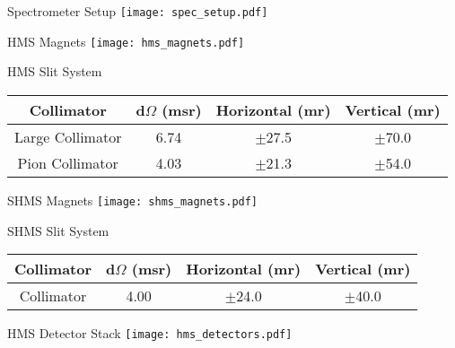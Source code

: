 \begin{Mfigure}{Spectrometer Setup}
  \centering
  \texttt{[image: spec\_setup.pdf]}
  \caption{Overview of Hall C Spectrometer setup.}
  \label{fig:2-4_spec_setup}
\end{Mfigure}

\begin{Mfigure}{HMS Magnets}
  \centering
  \texttt{[image: hms\_magnets.pdf]}
  \caption{Overview of HMS optical setup.}
  \label{fig:2-4_hms_magnets}
\end{Mfigure}

\begin{Mtable}{HMS Slit System}
  \centering
  \begin{tabular}{|c|c|c|c|}
    \hline
    \textbf{Collimator} & \textbf{d$\Omega$ (msr)} & \textbf{Horizontal (mr)} & \textbf{Vertical (mr)} \\
    \hline
    Large Collimator & 6.74 & $\pm$27.5 & $\pm$70.0 \\
    Pion Collimator & 4.03 & $\pm$21.3 & $\pm$54.0 \\
    \hline
  \end{tabular}
  \caption{Breakdown of HMS slit system's apertures.}
  \label{tab:2-4_hms_slit}
\end{Mtable}

\begin{Mfigure}{SHMS Magnets}
  \centering
  \texttt{[image: shms\_magnets.pdf]}
  \caption{Overview of SHMS optical setup.}
  \label{fig:2-4_shms_magnets}
\end{Mfigure}

\begin{Mtable}{SHMS Slit System}
  \centering
  \begin{tabular}{|c|c|c|c|}
    \hline
    \textbf{Collimator} & \textbf{d$\Omega$ (msr)} & \textbf{Horizontal (mr)} & \textbf{Vertical (mr)} \\
    \hline
     Collimator & 4.00 & $\pm$24.0 & $\pm$40.0 \\
    \hline
  \end{tabular}
  \caption{Breakdown of SHMS slit system's apertures.}
  \label{tab:2-4_shms_slit}
\end{Mtable}

\begin{Mfigure}{HMS Detector Stack}
  \centering
  \texttt{[image: hms\_detectors.pdf]}
  \caption{Overview of HMS Detector Stack.}
  \label{fig:2-4_hms_detectors}
\end{Mfigure}

